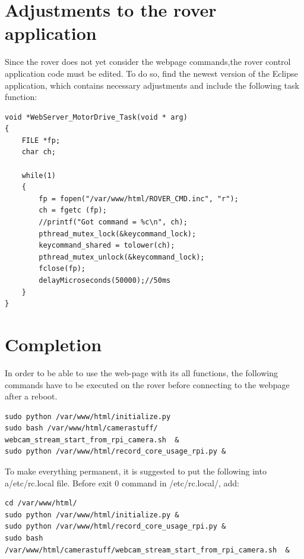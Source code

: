 \section{Adjustments to the rover application}
Since the rover does not yet consider the webpage commands,the rover control application code must be edited. To do so, find the newest version of the Eclipse application, which contains necessary adjustments and include the following task function:
\begin{lstlisting}
void *WebServer_MotorDrive_Task(void * arg)
{
	FILE *fp;
	char ch;

	while(1)
	{
		fp = fopen("/var/www/html/ROVER_CMD.inc", "r");
		ch = fgetc (fp);
		//printf("Got command = %c\n", ch);
		pthread_mutex_lock(&keycommand_lock);
		keycommand_shared = tolower(ch);
		pthread_mutex_unlock(&keycommand_lock);
		fclose(fp);
		delayMicroseconds(50000);//50ms
	}
}
\end{lstlisting}
\section{Completion}
In order to be able to use the web-page with its all functions, the following commands have to be executed on the rover before connecting to the webpage after a reboot.
\begin{lstlisting}
sudo python /var/www/html/initialize.py
sudo bash /var/www/html/camerastuff/ webcam_stream_start_from_rpi_camera.sh  &
sudo python /var/www/html/record_core_usage_rpi.py &
\end{lstlisting}
To make everything permanent, it is suggested to put the following into a/etc/rc.local file. Before exit 0 command in /etc/rc.local/, add:
\begin{lstlisting}
cd /var/www/html/
sudo python /var/www/html/initialize.py &
sudo python /var/www/html/record_core_usage_rpi.py &
sudo bash /var/www/html/camerastuff/webcam_stream_start_from_rpi_camera.sh  &
\end{lstlisting}
